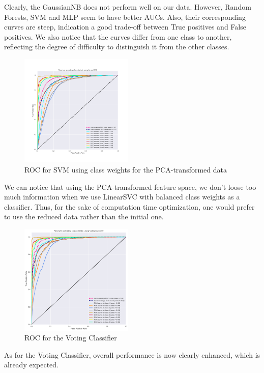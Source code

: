 \documentclass[a4paper,english,12pt, twocolumn]{article}
\makeatletter
\newcommand{\emptypage}[1]{
  \cleardoublepage
  \begingroup
  \let\ps@plain\ps@empty
  \pagestyle{empty}
  #1
  \cleardoublepage
  \endgroup}
\makeatother
\begin{document}
Clearly, the GaussianNB does not perform well on our data. However, Random Forests, SVM and MLP seem to have better AUCs. Also, their corresponding curves are steep, indication a good trade-off between True positives and False positives. We also notice that the curves differ from one class to another, reflecting the degree of difficulty to distinguish it from the other classes. 

\begin{figure}[H]
	\centering
	\includegraphics[width=0.48\textwidth,keepaspectratio]{ROC_OvR_LinearSVC_using_PCA}
	\caption{ROC for SVM using class weights for the PCA-transformed data}
\end{figure}

We can notice that using the PCA-transformed feature space, we don't loose too much information when we use LinearSVC with balanced class weights as a classifier. Thus, for the sake of computation time optimization, one would prefer to use the reduced data rather than the initial one.

\begin{figure}[H]
	\centering
	\includegraphics[width=0.48\textwidth,keepaspectratio]{ROC_OvR_Voting}
	\caption{ROC for the Voting Classifier}
\end{figure}

As for the Voting Classifier, overall performance is now clearly enhanced, which is already expected. 



%
%
\end{document}
